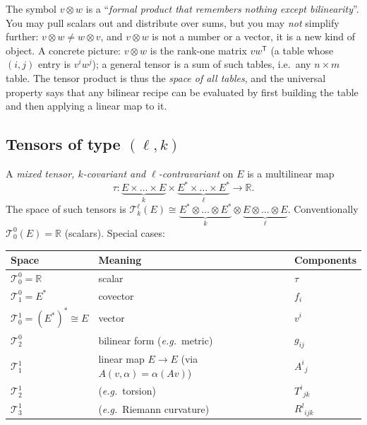\documentclass[11pt,a4paper]{article}
\numberwithin{equation}{section}
\theoremstyle{definition}
\theoremstyle{plain}
\newcommand{\R}{\mathbb{R}}
\newcommand{\TT}[2]{\mathcal{T}^{#1}_{#2}}          %
\newcommand{\eg}{\emph{e.g.}\ }
\begin{document}
\begin{intuition}
The symbol $v\otimes w$ is a ``\emph{formal product that remembers nothing except bilinearity}''. You may
pull scalars out and distribute over sums, but you may \emph{not} simplify further: $v\otimes w\neq w\otimes v$,
and $v\otimes w$ is not a number or a vector, it is a new kind of object.
A concrete picture: $v\otimes w$ is the rank-one matrix $vw^{\mathsf T}$ (a table whose $(i,j)$ entry is $v^iw^j$);
a general tensor is a sum of such tables, i.e.\ any $n\times m$ table. The tensor product is thus the
\emph{space of all tables}, and the universal property says that any bilinear recipe can be evaluated by first
building the table and then applying a linear map to it.
\end{intuition}


\subsection{Tensors of type $(\ell,k)$}\label{sec:tensortypes}
\begin{formal}[{tensors}]
A \emph{mixed tensor, $k$-covariant and $\ell$-contravariant} on $E$ is a multilinear map
\[
\tau:\underbrace{E\times\dots\times E}_{k}\times\underbrace{E^*\times\dots\times E^*}_{\ell}\to\R .
\]
The space of such tensors is $\TT{\ell}{k}(E)\cong \underbrace{E^*\otimes\dots\otimes E^*}_{k}\otimes\underbrace{E\otimes\dots\otimes E}_{\ell}$. Conventionally $\TT{0}{0}(E)=\R$ (scalars). Special cases:
\begin{center}
\begin{tabular}{@{}lll@{}}
\toprule
Space & Meaning & Components\\ \midrule
$\TT{0}{0}=\R$ & scalar & $\tau$\\
$\TT{0}{1}=E^*$ & covector & $f_i$\\
$\TT{1}{0}=(E^*)^*\cong E$ & vector & $v^i$\\
$\TT{0}{2}$ & bilinear form (\eg metric) & $g_{ij}$\\
$\TT{1}{1}$ & linear map $E\to E$ (via $A(v,\alpha)=\alpha(Av)$) & $A^i{}_j$\\
$\TT{1}{2}$ & (\eg torsion) & $T^i{}_{jk}$\\
$\TT{1}{3}$ & (\eg Riemann curvature) & $R^l{}_{ijk}$\\ \bottomrule
\end{tabular}
\end{center}
\end{formal}
\end{document}

